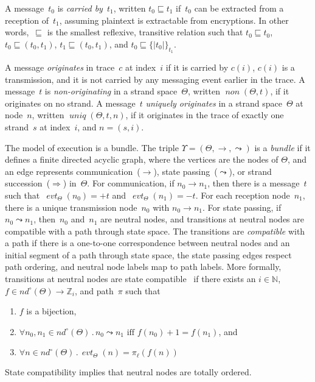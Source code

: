\documentclass[12pt]{article}
\newcommand{\fn}[1]{\ensuremath{\operatorname{\mathit{#1}}}}
\newcommand{\enc}[2]{\ensuremath{\{\!|#1|\!\}_{#2}}}
\newcommand{\inbnd}{\mathord -}
\newcommand{\outbnd}{\mathord +}
\newcommand{\neutral}{\mathord\circ}
\newcommand{\nat}{\ensuremath{\mathbb{N}}}
\newcommand{\zed}{\ensuremath{\mathbb{Z}}}
\newcommand{\all}[1]{\forall#1\mathpunct.}
\newcommand{\nnodes}{\operatorname{\mathit{nd}^{\neutral}}}
\newcommand{\pth}{\ensuremath{\pi}}
\newcommand{\evt}{\fn{evt}}
\begin{document}
A message~$t_0$ is \emph{carried by}~$t_1$, written $t_0\sqsubseteq
t_1$ if~$t_0$ can be extracted from a reception of~$t_1$, assuming
plaintext is extractable from encryptions.  In other
words,~$\sqsubseteq$ is the smallest reflexive, transitive relation
such that $t_0\sqsubseteq t_0$, $t_0\sqsubseteq (t_0, t_1)$,
$t_1\sqsubseteq (t_0, t_1)$, and $t_0\sqsubseteq\enc{t_0}{t_1}$.

A message \emph{originates} in trace~$c$ at index~$i$ if it is carried
by $c(i)$, $c(i)$ is a transmission, and it is not carried by any
messaging event earlier in the trace.  A message~$t$ is
\emph{non-originating} in a strand space~$\Theta$, written
$\fn{non}(\Theta,t)$, if it originates on no strand.  A message~$t$
\emph{uniquely originates} in a strand space~$\Theta$ at node~$n$,
written $\fn{uniq}(\Theta,t,n)$, if it originates in the trace of
exactly one strand~$s$ at index~$i$, and $n=(s,i)$.

The model of execution is a bundle.  The triple
$\Upsilon=(\Theta,\to,\leadsto)$ is a \emph{bundle} if it defines a
finite directed acyclic graph, where the vertices are the nodes of
$\Theta$, and an edge represents communication~($\to$), state
passing~($\leadsto$), or strand succession~($\Rightarrow$)
in~$\Theta$.  For communication, if $n_0\rightarrow n_1$, then there
is a message~$t$ such that~$\evt_\Theta(n_0)=\outbnd t$
and~$\evt_\Theta(n_1)=\inbnd t$.  For each reception node~$n_1$, there
is a unique transmission node~$n_0$ with $n_0\to n_1$.  For state
passing, if $n_0\leadsto n_1$, then~$n_0$ and~$n_1$ are neutral nodes,
and transitions at neutral nodes are compatible with a path through
state space.  The transitions are \emph{compatible} with a path if
there is a one-to-one correspondence between neutral nodes and an
initial segment of a path through state space, the state passing edges
respect path ordering, and neutral node labels map to path labels.
More formally, transitions at neutral nodes are state
compatible~\cite[Def.~11]{Guttman12} if there exists an $i\in\nat$,
$f\in\nnodes(\Theta)\to\zed_i$, and path~$\pth$ such that
\begin{enumerate}
\item\label{enum:bijection} $f$ is a bijection,
\item\label{enum:orderings} $\all{n_0,n_1\in\nnodes(\Theta)}
n_0\leadsto n_1\mbox{ iff }f(n_0)+1=f(n_1)$, and
\item\label{enum:labels} $\all{n\in\nnodes(\Theta)}
\evt_\Theta(n)=\pth_\ell(f(n))$
\end{enumerate}
State compatibility implies that neutral nodes are totally ordered.
\end{document}
